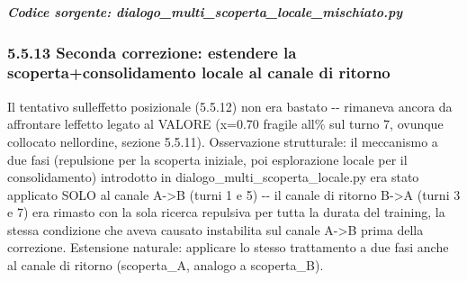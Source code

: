\documentclass[
  italian,
]{article}
\begin{document}
\textit{\textbf{Codice sorgente: dialogo\_\allowbreak{}multi\_\allowbreak{}scoperta\_\allowbreak{}locale\_\allowbreak{}mischiato.py}}


\subsubsection{5.5.13 Seconda correzione: estendere la scoperta+consolidamento locale al canale di ritorno}\label{seconda-correzione-estendere-la-scopertaconsolidamento-locale-al-canale-di-ritorno}

Il tentativo sull\textquotesingle effetto posizionale (5.5.12) non era bastato -\/- rimaneva ancora da affrontare l\textquotesingle effetto legato al VALORE (x=0.70 fragile all\% sul turno 7, ovunque collocato nell\textquotesingle ordine, sezione 5.5.11). Osservazione strutturale: il meccanismo a due fasi (repulsione per la scoperta iniziale, poi esplorazione locale per il consolidamento) introdotto in dialogo\_\allowbreak{}multi\_\allowbreak{}scoperta\_\allowbreak{}locale.py era stato applicato SOLO al canale A-\textgreater B (turni 1 e 5) -\/- il canale di ritorno B-\textgreater A (turni 3 e 7) era rimasto con la sola ricerca repulsiva per tutta la durata del training, la stessa condizione che aveva causato instabilita\textquotesingle{} sul canale A-\textgreater B prima della correzione. Estensione naturale: applicare lo stesso trattamento a due fasi anche al canale di ritorno (scoperta\_\allowbreak{}A, analogo a scoperta\_\allowbreak{}B).
\end{document}
